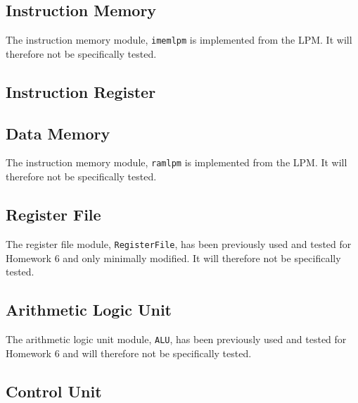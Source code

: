 
\subsection{Instruction Memory} %
\label{sub:instruction_memory}

The instruction memory module, \verb|imemlpm| is implemented from the LPM.
It will therefore not be specifically tested.


\subsection{Instruction Register} %
\label{sub:instruction_register}


\subsection{Data Memory} %
\label{sub:data_memory}

The instruction memory module, \verb|ramlpm| is implemented from the LPM.
It will therefore not be specifically tested.

\subsection{Register File} %
\label{sub:register_file}

The register file module, \verb|RegisterFile|, has been previously used and tested for Homework 6 and only minimally modified.
It will therefore not be specifically tested.

\subsection{Arithmetic Logic Unit} %
\label{sub:arithmetic_logic_unit}

The arithmetic logic unit module, \verb|ALU|, has been previously used and tested for Homework 6 and will therefore not be specifically tested.

\subsection{Control Unit} %
\label{sub:control_unit}

